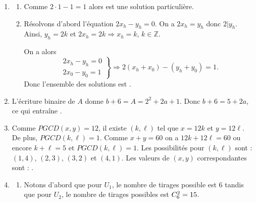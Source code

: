 	\begin{enumerate}
		\item 
			\begin{enumerate}
				\item {}
						Comme $2 \cdot 1 - 1 = 1$ alors  est une solution particuli\`ere.
				\item {}
						R\'esolvons d'abord l'\'equation $2x_h - y_h = 0$.
						On a $2x_h = y_h$ donc $2 | y_h$. Ainsi, $y_h = 2k$ et $2 x_h = 2 k \Rightarrow x_h = k$, $k \in \mathbb{Z}$.
						
						On a alors 
						\[
							\left.
								\begin{array}{r}
									2 x_h 	- y_h 	= 0 \\
									2 x_0 - y_0 = 1 
								\end{array}
							\right\rbrace
							\Rightarrow
							2 (x_h + x_0) - (y_h + y_0) = 1 .
						\]
						Donc l'ensemble des solutions est 
						.
			\end{enumerate}
		\item {}
				L'\'ecriture binaire de $A$ donne $b + 6 = A = 2^2 + 2 a + 1$.
				Donc $b + 6 = 5 + 2a$, ce qui entra\^ine .
		\item {}
				Comme $PGCD(x,y) = 12$, il existe $(k,\ell)$ tel que $x = 12 k $ et $y = 12 \ell$.
				De plus, $PGCD(k,\ell) = 1$.
				Comme $x + y = 60$ on a $12 k + 12 \ell = 60$ ou encore $k + \ell = 5$ et $PGCD(k,\ell) = 1$.
				Les possibilit\'es pour $(k,\ell)$ sont : $(1,4)$, $(2,3)$, $(3,2)$ et $(4,1)$.
				Les valeurs de $(x,y)$ correspondantes sont : .
		\item 
			\begin{enumerate}
				\item {}
					Notons d'abord que pour $U_1$, le nombre de tirages possible est $6$ tandis que
					pour $U_2$, le nombre de tirages possibles est $C_{6}^{2} = 15$.
\end{enumerate}
\end{enumerate}
